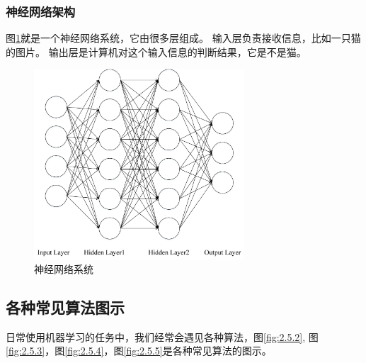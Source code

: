 \subsubsection{神经网络架构}
图\ref{fig:2.5.1}就是一个神经网络系统，它由很多层组成。
输入层负责接收信息，比如一只猫的图片。
输出层是计算机对这个输入信息的判断结果，它是不是猫。
\begin{figure}
  \centering
  \includegraphics[width=0.7\textwidth]{./img/ch2/mao.png}
  \caption{神经网络系统}
  \label{fig:2.5.1}
\end{figure}
\subsection{各种常见算法图示}
\label{ux5404ux79cdux5e38ux89c1ux7b97ux6cd5ux56feux793a}
日常使用机器学习的任务中，我们经常会遇见各种算法，图\ref{fig:2.5.2},
图\ref{fig:2.5.3}，图\ref{fig:2.5.4}，图\ref{fig:2.5.5}是各种常见算法的图示。

